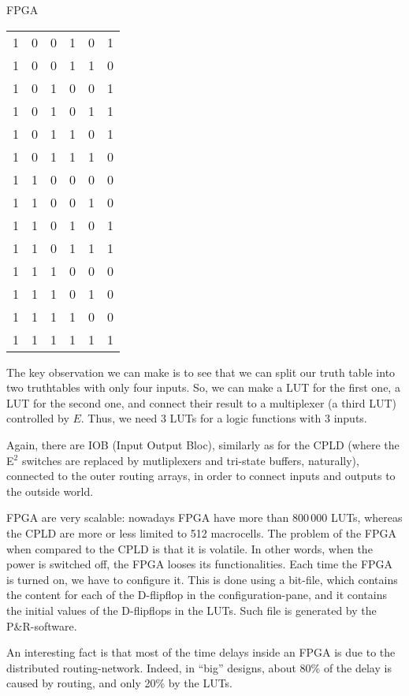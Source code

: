 \documentclass[a4paper]{article}
\begin{document}
\begin{parag}{FPGA}
\begin{center}
\begin{tabular}{ccccc|c}
            1 & 0 & 0 & 1 & 0 & 1 \\
            1 & 0 & 0 & 1 & 1 & 0 \\
            1 & 0 & 1 & 0 & 0 & 1 \\
            1 & 0 & 1 & 0 & 1 & 1 \\
            1 & 0 & 1 & 1 & 0 & 1 \\
            1 & 0 & 1 & 1 & 1 & 0 \\
            1 & 1 & 0 & 0 & 0 & 0 \\
            1 & 1 & 0 & 0 & 1 & 0 \\
            1 & 1 & 0 & 1 & 0 & 1 \\
            1 & 1 & 0 & 1 & 1 & 1 \\
            1 & 1 & 1 & 0 & 0 & 0 \\
            1 & 1 & 1 & 0 & 1 & 0 \\
            1 & 1 & 1 & 1 & 0 & 0 \\
            1 & 1 & 1 & 1 & 1 & 1 \\
        \end{tabular}
    \end{center}

    The key observation we can make is to see that we can split our truth table into two truthtables with only four inputs. So, we can make a LUT for the first one, a LUT for the second one, and connect their result to a multiplexer (a third LUT) controlled by $E$. Thus, we need 3 LUTs for a logic functions with 3 inputs.

    Again, there are IOB (Input Output Bloc), similarly as for the CPLD (where the E$^2$ switches are replaced by mutliplexers and tri-state buffers, naturally), connected to the outer routing arrays, in order to connect inputs and outputs to the outside world.
    
    FPGA are very scalable: nowadays FPGA have more than $800\,000$ LUTs, whereas the CPLD are more or less limited to 512 macrocells. The problem of the FPGA when compared to the CPLD is that it is volatile. In other words, when the power is switched off, the FPGA looses its functionalities. Each time the FPGA is turned on, we have to configure it. This is done using a bit-file, which contains the content for each of the D-flipflop in the configuration-pane, and it contains the initial values of the D-flipflops in the LUTs. Such file is generated by the P\&R-software.

    An interesting fact is that most of the time delays inside an FPGA is due to the distributed routing-network. Indeed, in ``big'' designs, about 80\% of the delay is caused by routing, and only 20\% by the LUTs.
\end{parag}
\end{document}
